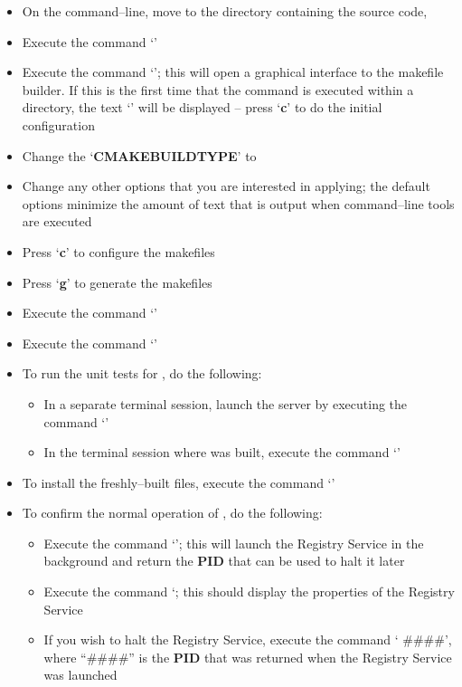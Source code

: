 \begin{itemize}
\item On the command--line, move to the directory containing the \mplusm{} source code,
\item Execute the command `'
\item Execute the command `'; this will open a graphical interface to the
makefile builder. If this is the first time that the command is executed within a
directory, the text `' will be displayed -- press `\textbf{c}' to do
the initial configuration
\item Change the `\textbf{CMAKE\fUS{}BUILD\fUS{}TYPE}' to 
\item Change any other options that you are interested in applying; the default options
minimize the amount of text that is output when \mplusm{} command--line tools are
executed
\item Press `\textbf{c}' to configure the makefiles
\item Press `\textbf{g}' to generate the makefiles
\item Execute the command `'
\item Execute the command `'
\item To run the unit tests for \mplusm{}, do the following:
\begin{itemize}
\item In a separate terminal session, launch the \yarp{} server by executing the command
`'
\item In the terminal session where \mplusm{} was built, execute the command
`'
\end{itemize}
\item To install the freshly--built \mplusm{} files, execute the command
`'
\item To confirm the normal operation of \mplusm{}, do the following:
\begin{itemize}
\item Execute the command `'; this will launch the Registry
Service in the background and return the \textbf{PID} that can be used to halt it later
\item Execute the command `; this should display the properties
of the Registry Service
\item If you wish to halt the Registry Service, execute the command `
\#\#\#\#', where ``\#\#\#\#'' is the \textbf{PID} that was returned when the Registry
Service was launched
\end{itemize}
\end{itemize}
